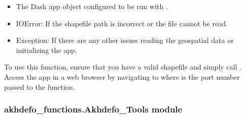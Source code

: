 \documentclass[letterpaper,10pt,english]{sphinxmanual}
\begin{document}
\begin{fulllineitems}
\begin{description}
\begin{itemize}
\begin{description}
\end{description}

\end{itemize}

\begin{itemize}
\item {} 
\sphinxAtStartPar
The Dash app object configured to be run with .

\end{itemize}

\begin{itemize}
\item {} 
\sphinxAtStartPar
IOError: If the shapefile path is incorrect or the file cannot be read.

\item {} 
\sphinxAtStartPar
Exception: If there are any other issues reading the geospatial data or initializing the app.

\end{itemize}

\sphinxAtStartPar
To use this function, ensure that you have a valid shapefile and simply call .
Access the app in a web browser by navigating to  where  is the port number passed to the function.

\end{description}

\end{fulllineitems}



\subsubsection{akhdefo\_functions.Akhdefo\_Tools module}
\label{\detokenize{akhdefo_functions:module-akhdefo_functions.Akhdefo_Tools}}\label{\detokenize{akhdefo_functions:akhdefo-functions-akhdefo-tools-module}}
\end{document}
